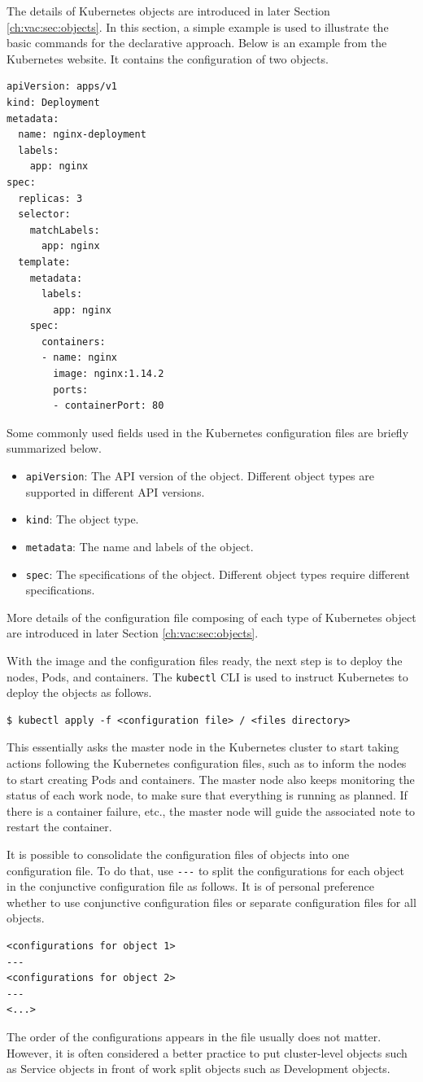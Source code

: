 The details of Kubernetes objects are introduced in later Section \ref{ch:vac:sec:objects}. In this section, a simple example is used to illustrate the basic commands for the declarative approach. Below is an example from the Kubernetes website. It contains the configuration of two objects.
\begin{lstlisting}
apiVersion: apps/v1
kind: Deployment
metadata:
  name: nginx-deployment
  labels:
    app: nginx
spec:
  replicas: 3
  selector:
    matchLabels:
      app: nginx
  template:
    metadata:
      labels:
        app: nginx
    spec:
      containers:
      - name: nginx
        image: nginx:1.14.2
        ports:
        - containerPort: 80
\end{lstlisting}

Some commonly used fields used in the Kubernetes configuration files are briefly summarized below.
\begin{itemize}
	\item \verb|apiVersion|: The API version of the object. Different object types are supported in different API versions.
	\item \verb|kind|: The object type.
	\item \verb|metadata|: The name and labels of the object. 
	\item \verb|spec|: The specifications of the object. Different object types require different specifications.
\end{itemize}
More details of the configuration file composing of each type of Kubernetes object are introduced in later Section \ref{ch:vac:sec:objects}. 

With the image and the configuration files ready, the next step is to deploy the nodes, Pods, and containers. The \verb|kubectl| CLI is used to instruct Kubernetes to deploy the objects as follows.
\begin{lstlisting}
$ kubectl apply -f <configuration file> / <files directory>
\end{lstlisting}
This essentially asks the master node in the Kubernetes cluster to start taking actions following the Kubernetes configuration files, such as to inform the nodes to start creating Pods and containers. The master node also keeps monitoring the status of each work node, to make sure that everything is running as planned. If there is a container failure, etc., the master node will guide the associated note to restart the container.

It is possible to consolidate the configuration files of objects into one configuration file. To do that, use \verb|---| to split the configurations for each object in the conjunctive configuration file as follows. It is of personal preference whether to use conjunctive configuration files or separate configuration files for all objects.
\begin{lstlisting}
<configurations for object 1>
---
<configurations for object 2>
---
<...>
\end{lstlisting}
The order of the configurations appears in the file usually does not matter. However, it is often considered a better practice to put cluster-level objects such as Service objects in front of work split objects such as Development objects.

